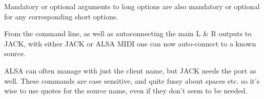    Mandatory or optional arguments to long options are also mandatory or
   optional for any corresponding short options.

   From the command line, as well as autoconnecting the main L \& R outputs
   to JACK, with either JACK or ALSA MIDI one can now auto-connect to a
   known source.

   ALSA can often manage with just the client name, but JACK needs the port
   as well. These commands are case sensitive, and quite fussy about spaces
   etc. so it's wise to use quotes for the source name, even if they don't
   seem to be needed.

